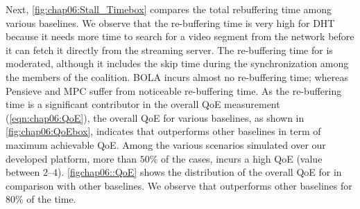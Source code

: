 Next, \fig\ref{fig:chap06:Stall_Timebox} compares the total rebuffering time among various baselines. We observe that the re-buffering time is very high for \ac{DHT} because it needs more time to search for a video segment from the network before it can fetch it directly from the streaming server. The re-buffering time for {\our} is moderated, although it includes the skip time during the synchronization among the members of the coalition. BOLA incurs almost no re-buffering time; whereas Pensieve and MPC suffer from noticeable re-buffering time. As the re-buffering time is a significant contributor in the overall \ac{QoE} measurement (\eqn\ref{eqn:chap06:QoE}), the overall \ac{QoE} for various baselines, as shown in \fig\ref{fig:chap06:QoEbox}, indicates that {\our} outperforms other baselines in term of maximum achievable \ac{QoE}.  Among the various scenarios simulated over our developed platform, more than $50\%$ of the cases, {\our} incurs a high \ac{QoE} (value between $2$--$4$). \fig\ref{figchap06::QoE} shows the distribution of the overall \ac{QoE} for {\our} in comparison with other baselines. We observe that {\our} outperforms other baselines for $80\%$ of the time.


